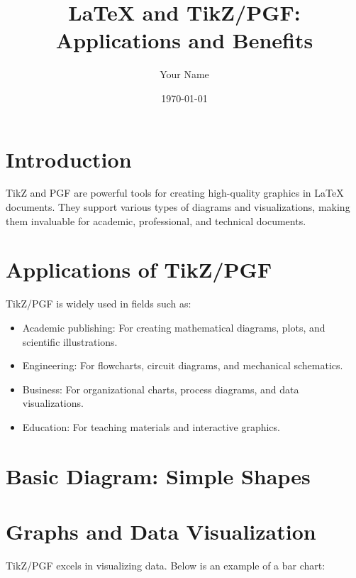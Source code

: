 \documentclass{article}
\begin{document}
\title{LaTeX and TikZ/PGF: Applications and Benefits}
\author{Your Name}
\date{\today}
\maketitle

\section{Introduction}
TikZ and PGF are powerful tools for creating high-quality graphics in LaTeX documents. They support various types of diagrams and visualizations, making them invaluable for academic, professional, and technical documents.

\section{Applications of TikZ/PGF}
TikZ/PGF is widely used in fields such as:
\begin{itemize}
    \item Academic publishing: For creating mathematical diagrams, plots, and scientific illustrations.
    \item Engineering: For flowcharts, circuit diagrams, and mechanical schematics.
    \item Business: For organizational charts, process diagrams, and data visualizations.
    \item Education: For teaching materials and interactive graphics.
\end{itemize}

\section{Basic Diagram: Simple Shapes}

\section{Graphs and Data Visualization}
TikZ/PGF excels in visualizing data. Below is an example of a bar chart:

\end{document}
